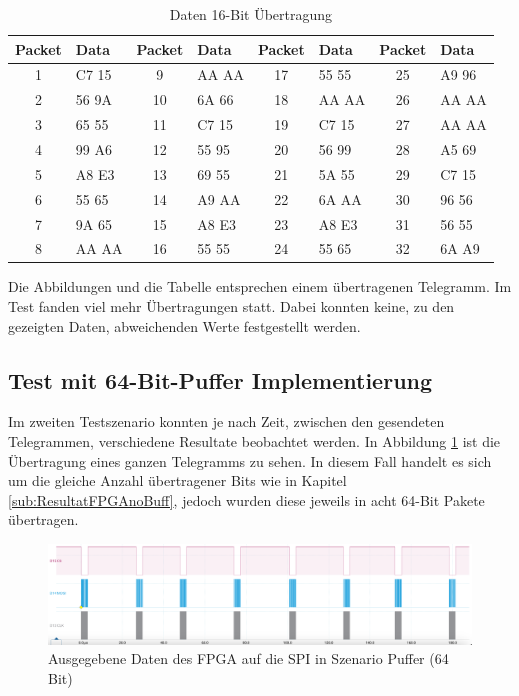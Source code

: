 \begin{table}[H]
    \centering
    \begin{tabular}{cl||cl||cl||cl}
        \toprule
        \textbf{Packet} & \textbf{Data} & \textbf{Packet} & \textbf{Data} & \textbf{Packet} & \textbf{Data} & \textbf{Packet} & \textbf{Data} \\ 
        \midrule
        1  & C7 15 & 9  & AA AA & 17 & 55 55 & 25 & A9 96 \\
        2  & 56 9A & 10 & 6A 66 & 18 & AA AA & 26 & AA AA \\
        3  & 65 55 & 11 & C7 15 & 19 & C7 15 & 27 & AA AA \\
        4  & 99 A6 & 12 & 55 95 & 20 & 56 99 & 28 & A5 69 \\
        5  & A8 E3 & 13 & 69 55 & 21 & 5A 55 & 29 & C7 15 \\
        6  & 55 65 & 14 & A9 AA & 22 & 6A AA & 30 & 96 56 \\
        7  & 9A 65 & 15 & A8 E3 & 23 & A8 E3 & 31 & 56 55 \\
        8  & AA AA & 16 & 55 55 & 24 & 55 65 & 32 & 6A A9 \\
        \bottomrule
    \end{tabular}
    \caption{Daten 16-Bit Übertragung}
    \label{tab:packet_data}
\end{table}

Die Abbildungen und die Tabelle entsprechen einem übertragenen Telegramm. Im Test fanden viel mehr Übertragungen statt. Dabei konnten keine, zu den gezeigten Daten, abweichenden Werte festgestellt werden.

\subsection{Test mit 64-Bit-Puffer Implementierung}
\label{sub:ResultatFPGABuff}
Im zweiten Testszenario konnten je nach Zeit, zwischen den gesendeten Telegrammen, verschiedene Resultate beobachtet werden. In Abbildung \ref{fig:ResultatFPGABuff} ist die Übertragung eines ganzen Telegramms zu sehen. In diesem Fall handelt es sich um die gleiche Anzahl übertragener Bits wie in Kapitel \ref{sub:ResultatFPGAnoBuff}, jedoch wurden diese jeweils in acht 64-Bit Pakete übertragen.

\begin{figure}[H]
    \centering
    \includegraphics[width=1\linewidth]{Figures/Chap4/FPGA/Test_FPGA_Buff_signal.png}
    \caption{Ausgegebene Daten des FPGA auf die SPI in Szenario Puffer (64 Bit)}
    \label{fig:ResultatFPGABuff}
\end{figure}


